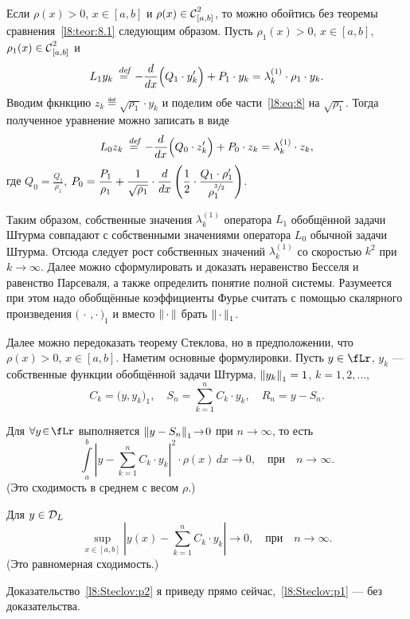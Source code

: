 Если $\rho(x)>0$, $x\in[a,b]$ и $\rho(x)\in\Cfn[{[a,b]}]{2}$, то можно обойтись без теоремы сравнения~\ref{l8:teor:8.1} следующим образом. Пусть $\rho_1(x)>0$, $x\in[a,b]$, $\rho_1(x)\in\Cfn[{[a,b]}]{2}$ и 
\begin{equation}\label{l8:eq:8}
	 L_1y_k\eqdef-\der{}{x}\Big(Q_1\cdot y'_k\Big)+P_1\cdot y_k=\lambda_k^{(1)}\cdot\rho_1\cdot y_k.
\end{equation}
Вводим фкнкцию $z_k\eqdef\sqrt{\rho_1}\cdot y_k$ и поделим обе части~\eqref{l8:eq:8} на $\sqrt{\rho_1}$. Тогда полученное уравнение можно записать в виде
\begin{equation}\label{l8:eq:9}
	 L_0z_k\eqdef-\der{}{x}\Big(Q_0\cdot z'_k\Big)+P_0\cdot z_k=\lambda_k^{(1)}\cdot z_k,
\end{equation}
где $\displaystyle Q_0=\frac{Q_1}{\rho_1}$, $\displaystyle P_0=\frac{P_1}{\rho_1}+\frac1{\sqrt{\rho_1}}\cdot\der{}{x}\left(\frac12\cdot\frac{Q_1\cdot\rho'_1}{\rho_1^{\sfrac{3}{2}}}\right)$.

Таким образом, собственные значения $\lambda_k^{(1)}$ оператора $L_1$ обобщённой задачи Штурма совпадают с собственными значениями оператора $L_0$ обычной задачи Штурма. Отсюда следует рост собственных значений $\lambda_k^{(1)}$ со скоростью $k^2$ при $k\to\infty$. Далее можно сформулировать и доказать неравенство Бесселя и равенство Парсеваля, а также определить понятие полной системы. Разумеется при этом надо обобщённые коэффициенты Фурье считать с помощью скалярного произведения $\big(\,\cdot\,,\cdot\,\big)_1$ и вместо $\norm{\,\cdot\,}$ брать $\norm{\,\cdot\,}_1$.

Далее можно передоказать теорему Стеклова, но в предположении, что $\rho(x)>0$, $x\in[a,b]$. Наметим основные формулировки. Пусть $y\in\fLr$, $y_k$ --- собственные функции обобщённой задачи Штурма, $\norm{y_k}_1=1$, $k=1,2,\ldots$,
\begin{equation*}
	 C_k=\big(y,y_k\big)_1,\quad S_n=\sum\limits_{k=1}^n C_k\cdot y_k,\quad R_n=y-S_n.
\end{equation*}
\begin{Teor}[Стеклова]\label{l8:teor:Steclov}\hfill
	\begin{enumerateP1}
		\item\label{l8:Steclov:p1} Для $\forall y\!\in\!\fLr$ выполняется $\norm{y-S_n}_1\!\to\!0$ при $n\!\to\!\infty$, то есть
		\begin{equation*}
			\int\limits_a^b\left|y-\sum\limits_{k=1}^n C_k\cdot y_k\right|^2\cdot\rho(x)\,dx\to0,\quad\text{при}\quad n\to\infty.
		\end{equation*}
		(Это сходимость в среднем с весом $\rho$.)
		
		\item\label{l8:Steclov:p2} Для $y\in\mc{D}_L$
		\begin{equation*}
			\sup\limits_{x\in[a,b]}\left|y(x)-\sum\limits_{k=1}^{n}C_k\cdot y_k\right|\to0,\quad\text{при}\quad n\to\infty.
		\end{equation*}
		(Это равномерная сходимость.)
	\end{enumerateP1}
\end{Teor}
\noindent Доказательство~\ref{l8:Steclov:p2} я приведу прямо сейчас,~\ref{l8:Steclov:p1} --- без доказательства.

